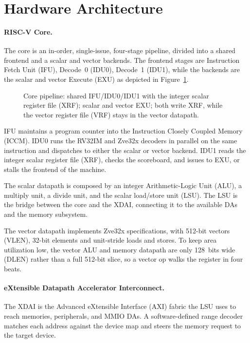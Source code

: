 \section{Hardware Architecture}
\label{sec:arch}


\paragraph{RISC-V Core.}
The core is an in-order, single-issue, four-stage pipeline, divided into a shared frontend and a scalar and vector backends.
The frontend stages are Instruction Fetch Unit ({IFU}), Decode~0 ({IDU0}),
Decode~1 ({IDU1}), while the backends are the scalar and vector Execute ({EXU}) as depicted in Figure~\ref{fig:core-pipe}.

\begin{figure}[t]
  \centering
  
  \caption{Core pipeline: shared {IFU}/{IDU0}/{IDU1} with the
    integer scalar register file ({XRF}); scalar and vector {EXU};
    both write {XRF}, while the vector register file ({VRF}) stays in
    the vector datapath.}
  \label{fig:core-pipe}
\end{figure}

{IFU} maintains a program counter into the Instruction Closely Coupled
Memory ({ICCM}).
{IDU0} runs the {RV32IM} and {Zve32x} decoders in parallel on the same
instruction and dispatches to either the scalar or vector backend.
{IDU1} reads the integer scalar register file ({XRF}), checks the
scoreboard, and
issues to {EXU}, or stalls the frontend of the machine.

The scalar datapath is composed by an integer Arithmetic-Logic Unit ({ALU}), a multiply unit, 
a divide unit, and the scalar load/store unit ({LSU}).
The {LSU} is the bridge between the core and the XDAI, connecting it to the available DAs
and the memory subsystem.

The vector datapath implements {Zve32x} specifications, with 512-bit vectors
({VLEN}), 32-bit elements and unit-stride loads and stores.
To keep area utilization low, the vector {ALU} and memory datapath are
only 128~bits wide ({DLEN}) rather than a full 512-bit slice, so a
vector op walks the register in four beats.

\paragraph{eXtensible Datapath Accelerator Interconnect.} %
The {XDAI} is the Advanced eXtensible Interface ({AXI}) fabric the
{LSU} uses to reach memories, peripherals, and {MMIO}
{DA}s. A software-defined range decoder matches each address against the
device map and steers the memory request to the target device.

